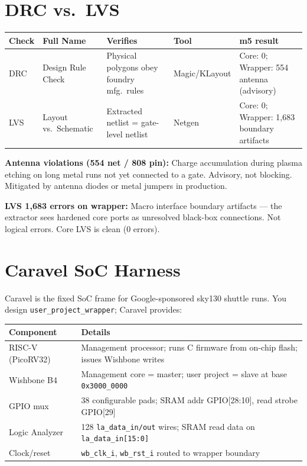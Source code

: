 \documentclass[10pt]{article}
\begin{document}
\section{DRC vs.\ LVS}

\begin{center}
\small
\begin{tabular}{llp{3.8cm}lp{4cm}}
\toprule
Check & Full Name & Verifies & Tool & m5 result \\
\midrule
DRC & Design Rule Check & Physical polygons obey foundry mfg.\ rules & Magic/KLayout & Core: 0; Wrapper: 554 antenna (advisory) \\
LVS & Layout vs.\ Schematic & Extracted netlist = gate-level netlist & Netgen & Core: 0; Wrapper: 1,683 boundary artifacts \\
\bottomrule
\end{tabular}
\end{center}

\textbf{Antenna violations (554 net / 808 pin):} Charge accumulation during plasma
etching on long metal runs not yet connected to a gate. Advisory, not blocking.
Mitigated by antenna diodes or metal jumpers in production.

\textbf{LVS 1,683 errors on wrapper:} Macro interface boundary artifacts --- the
extractor sees hardened core ports as unresolved black-box connections.
Not logical errors. Core LVS is clean (0 errors).

\section{Caravel SoC Harness}

Caravel is the fixed SoC frame for Google-sponsored sky130 shuttle runs.
You design \texttt{user\_project\_wrapper}; Caravel provides:

\begin{center}
\small
\begin{tabular}{lp{8.5cm}}
\toprule
Component & Details \\
\midrule
RISC-V (PicoRV32) & Management processor; runs C firmware from on-chip flash; issues Wishbone writes \\
Wishbone B4 & Management core = master; user project = slave at base \texttt{0x3000\_0000} \\
GPIO mux & 38 configurable pads; SRAM addr GPIO[28:10], read strobe GPIO[29] \\
Logic Analyzer & 128 \texttt{la\_data\_in/out} wires; SRAM read data on \texttt{la\_data\_in[15:0]} \\
Clock/reset & \texttt{wb\_clk\_i}, \texttt{wb\_rst\_i} routed to wrapper boundary \\
\bottomrule
\end{tabular}
\end{center}
\end{document}
